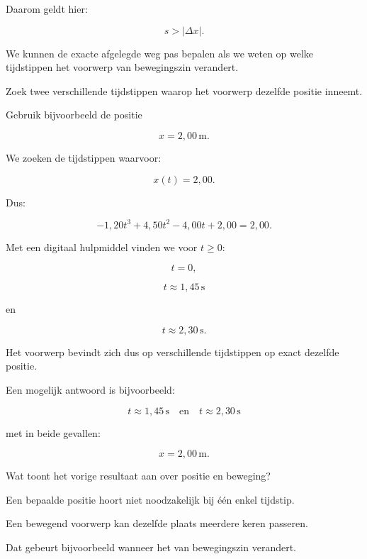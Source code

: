 \documentclass{ximera}
\begin{document}
\begin{oefening}{\oefU\ESS}
\begin{question}
\begin{oplossing}
  Daarom geldt hier:
  
  \[
  s>|\Delta x|.
  \]
  
  We kunnen de exacte afgelegde weg pas bepalen als we weten op welke
  tijdstippen het voorwerp van bewegingszin verandert.
  \end{oplossing}
  \end{question}
  
  
  \begin{question}
  Zoek twee verschillende tijdstippen waarop het voorwerp dezelfde positie
  inneemt.
  
  Gebruik bijvoorbeeld de positie
  
  \[
  x=2{,}00\,\mathrm{m}.
  \]
  
  \begin{oplossing}
  We zoeken de tijdstippen waarvoor:
  
  \[
  x(t)=2{,}00.
  \]
  
  Dus:
  
  \[
  -1{,}20t^3
  +4{,}50t^2
  -4{,}00t
  +2{,}00
  =
  2{,}00.
  \]
  
  Met een digitaal hulpmiddel vinden we voor $t\geq0$:
  
  \[
  t=0,
  \]
  
  \[
  t\approx1{,}45\,\mathrm{s}
  \]
  
  en
  
  \[
  t\approx2{,}30\,\mathrm{s}.
  \]
  
  Het voorwerp bevindt zich dus op verschillende tijdstippen op exact dezelfde
  positie.
  
  Een mogelijk antwoord is bijvoorbeeld:
  
  \[
  \boxed{
  t\approx1{,}45\,\mathrm{s}
  \quad\text{en}\quad
  t\approx2{,}30\,\mathrm{s}
  }
  \]
  
  met in beide gevallen:
  
  \[
  x=2{,}00\,\mathrm{m}.
  \]
  \end{oplossing}
  \end{question}
  
  
  \begin{question}
  Wat toont het vorige resultaat aan over positie en beweging?
  
  \begin{oplossing}
  Een bepaalde positie hoort niet noodzakelijk bij één enkel tijdstip.
  
  Een bewegend voorwerp kan dezelfde plaats meerdere keren passeren.
  
  Dat gebeurt bijvoorbeeld wanneer het van bewegingszin verandert.
  

\end{oplossing}
\end{question}
\end{oefening}
\end{document}
